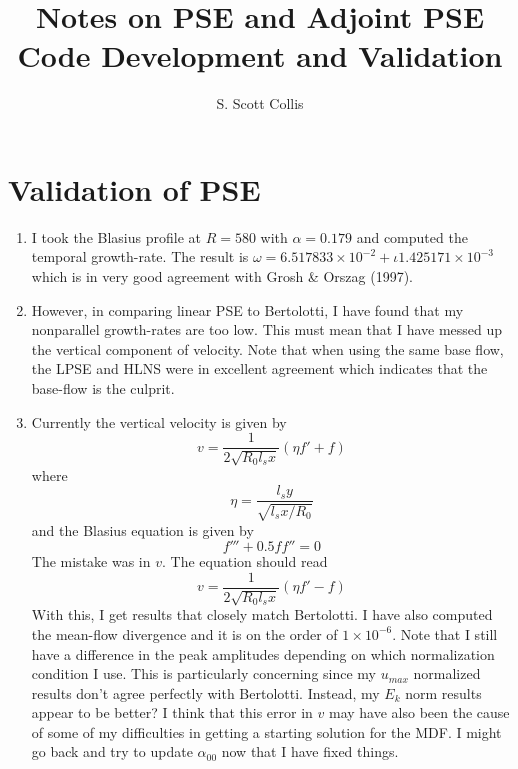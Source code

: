 \documentclass[12pt]{article}
\begin{document}
\title{Notes on PSE and Adjoint PSE Code Development and Validation}
\author{S. Scott Collis}
\maketitle

\section{Validation of PSE}

\begin{enumerate}
\item I took the Blasius profile at $R=580$ with $\alpha=0.179$ and computed
the temporal growth-rate.  The result is $\omega = 6.517833\times 10^{-2} +
\iota 1.425171\times 10^{-3}$ which is in very good agreement with Grosh \&
Orszag (1997).
\item However, in comparing linear PSE to Bertolotti, I have found that my
nonparallel growth-rates are too low.  This must mean that I have messed up
the vertical component of velocity.  Note that when using the same base flow,
the LPSE and HLNS were in excellent agreement which indicates that the
base-flow is the culprit.
\item Currently the vertical velocity is given by
%
\begin{equation}
  v = \frac{1}{2\sqrt{R_0 l_s x}} \left( \eta f' + f \right)
\end{equation}
%
where
%
\begin{equation}
  \eta = \frac{l_s y}{\sqrt{l_s x / R_0}}
\end{equation}
%
and the Blasius equation is given by
%
\begin{equation}
  f''' + 0.5 f f'' = 0
\end{equation} 
%
The mistake was in $v$.  The equation should read
%
\begin{equation}
  v = \frac{1}{2\sqrt{R_0 l_s x}} \left( \eta f' - f \right)
\end{equation}
%
With this, I get results that closely match Bertolotti.  I have also computed
the mean-flow divergence and it is on the order of $1\times 10^{-6}$.  Note
that I still have a difference in the peak amplitudes depending on which
normalization condition I use.  This is particularly concerning since my
$u_{max}$ normalized results don't agree perfectly with Bertolotti.  Instead,
my $E_k$ norm results appear to be better?  I think that this error in $v$ may
have also been the cause of some of my difficulties in getting a starting
solution for the MDF.  I might go back and try to update $\alpha_{00}$ now
that I have fixed things.

\end{enumerate}
\end{document}
